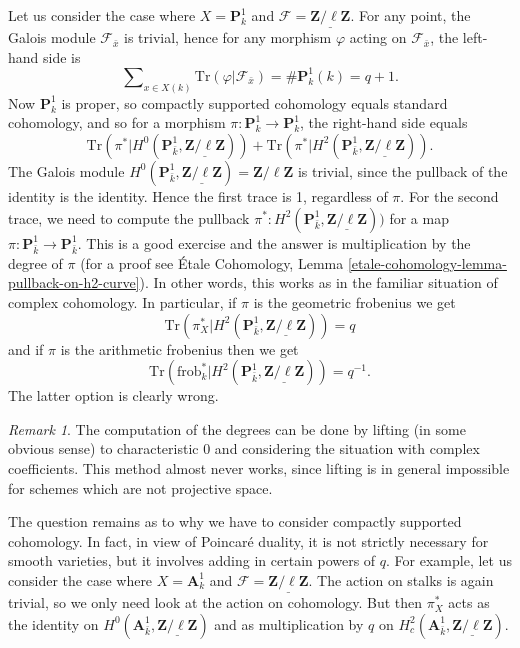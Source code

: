 \documentclass{stacks-project}
\theoremstyle{plain}
\theoremstyle{definition}
\theoremstyle{remark}
\newtheorem{remark}[subsection]{Remark}
\numberwithin{equation}{subsection}
\begin{document}
\medskip\noindent
Let us consider the case where $X = \mathbf{P}^1_k$ and $\mathcal{F} =
\underline{\mathbf{Z}/\ell\mathbf{Z}}$. For any point, the Galois module
$\mathcal{F}_{\bar x}$ is trivial, hence for any morphism $\varphi$ acting on
$\mathcal{F}_{\bar x}$, the left-hand side is
$$
\sum\nolimits_{x \in X(k)} \text{Tr}(\varphi | \mathcal{F}_{\bar x}) =
\#\mathbf{P}^1_k(k) = q+1.
$$
Now $\mathbf{P}^1_k$ is proper, so compactly supported cohomology equals
standard cohomology, and so for a morphism $\pi : \mathbf{P}^1_k \to
\mathbf{P}^1_k$, the right-hand side equals
$$
\text{Tr}(\pi^* | H^0 (\mathbf{P}^1_{\bar k},
\underline{\mathbf{Z}/\ell\mathbf{Z}})) + \text{Tr}(\pi^* | H^2
(\mathbf{P}^1_{\bar k}, \underline{\mathbf{Z}/\ell\mathbf{Z}})).
$$
The Galois module $H^0 (\mathbf{P}^1_{\bar k},
\underline{\mathbf{Z}/\ell\mathbf{Z}}) = \mathbf{Z}/\ell\mathbf{Z}$ is trivial,
since the pullback of the identity is the identity. Hence the first trace is 1,
regardless of $\pi$. For the second trace, we need to compute the pullback
$\pi^* : H^2(\mathbf{P}^1_{\bar k}, \underline{\mathbf{Z}/\ell\mathbf{Z}}))$
for a map $\pi : \mathbf{P}^1_{\bar k} \to \mathbf{P}^1_{\bar k}$. This is a
good exercise and the answer is multiplication by the degree of $\pi$
(for a proof see
\'Etale Cohomology, Lemma \ref{etale-cohomology-lemma-pullback-on-h2-curve}).
In other words, this works as in the familiar situation of complex cohomology.
In particular, if $\pi$ is the geometric frobenius we get
$$
\text{Tr}(\pi_X^* | H^2 (\mathbf{P}^1_{\bar k},
\underline{\mathbf{Z}/\ell\mathbf{Z}})) = q
$$
and if $\pi$ is the arithmetic frobenius then we get
$$
\text{Tr}(\text{frob}_k^* | H^2 (\mathbf{P}^1_{\bar k},
\underline{\mathbf{Z}/\ell\mathbf{Z}})) = q^{-1}.
$$
The latter option is clearly wrong.

\begin{remark}
\label{remark-compute-degree-lifting}
The computation of the degrees can be done by lifting (in some obvious sense)
to characteristic 0 and considering the situation with complex coefficients.
This method almost never works, since lifting is in general impossible for
schemes which are not projective space.
\end{remark}

\noindent
The question remains as to why we have to consider compactly supported
cohomology. In fact, in view of Poincar\'e duality, it is not strictly
necessary for smooth varieties, but it involves adding in certain powers
of $q$. For example, let us consider the case where
$X = \mathbf{A}^1_k$ and
$\mathcal{F} = \underline{\mathbf{Z}/\ell\mathbf{Z}}$.
The action on stalks is again trivial, so we only need look at the action
on cohomology. But then $\pi_X^*$ acts as the identity on
$H^0(\mathbf{A}^1_{\bar k}, \underline{\mathbf{Z}/\ell\mathbf{Z}})$
and as multiplication by $q$ on
$H^2_c(\mathbf{A}^1_{\bar k}, \underline{\mathbf{Z}/\ell\mathbf{Z}})$.
\end{document}
